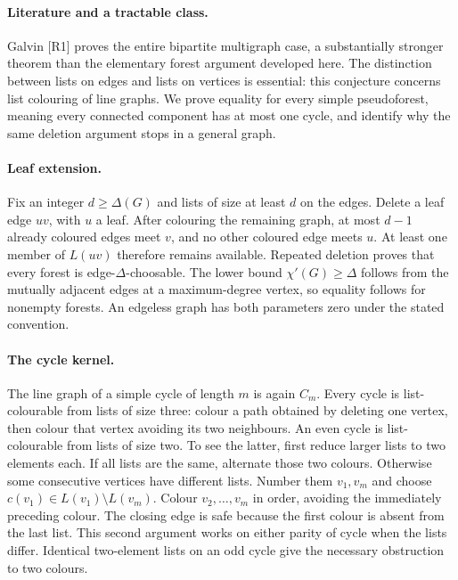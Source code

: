 \documentclass[11pt,a4paper]{article}
\begin{document}
\paragraph{Literature and a tractable class.}
Galvin [R1] proves the entire bipartite multigraph case, a substantially
stronger theorem than the elementary forest argument developed here.
The distinction between lists on edges and lists on vertices is essential:
this conjecture concerns list colouring of line graphs. We prove equality
for every simple pseudoforest, meaning every connected component has at
most one cycle, and identify why the same deletion argument stops in a
general graph.

\paragraph{Leaf extension.}
Fix an integer $d\ge\Delta(G)$ and lists of size at least $d$ on the edges.
Delete a leaf edge $uv$, with $u$ a leaf. After colouring the remaining
graph, at most $d-1$ already coloured edges meet $v$, and no other coloured
edge meets $u$. At least one member of $L(uv)$ therefore remains available.
Repeated deletion proves that every forest is edge-$\Delta$-choosable.
The lower bound $\chi'(G)\ge\Delta$ follows from the mutually adjacent
edges at a maximum-degree vertex, so equality follows for nonempty forests.
An edgeless graph has both parameters zero under the stated convention.

\paragraph{The cycle kernel.}
The line graph of a simple cycle of length $m$ is again $C_m$.
Every cycle is list-colourable from lists of size three: colour a path
obtained by deleting one vertex, then colour that vertex avoiding its two
neighbours. An even cycle is list-colourable from lists of size two.
To see the latter, first reduce larger lists to two elements each. If all
lists are the same, alternate those two colours. Otherwise some consecutive
vertices have different lists. Number them $v_1,v_m$ and choose
$c(v_1)\in L(v_1)\setminus L(v_m)$. Colour $v_2,\ldots,v_m$ in order,
avoiding the immediately preceding colour. The closing edge is safe because
the first colour is absent from the last list. This second argument works
on either parity of cycle when the lists differ. Identical two-element
lists on an odd cycle give the necessary obstruction to two colours.
\end{document}
